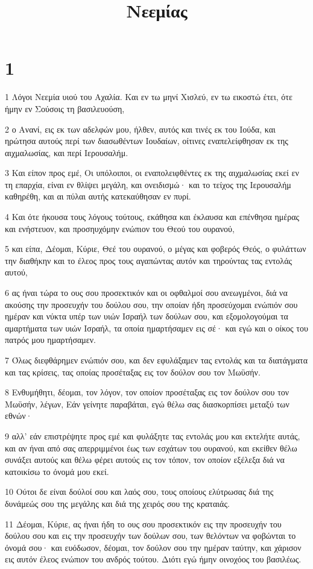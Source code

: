 

\title{Νεεμίας}


\chapter{1}

\par 1 Λόγοι Νεεμία υιού του Αχαλία. Και εν τω μηνί Χισλεύ, εν τω εικοστώ έτει, ότε ήμην εν Σούσοις τη βασιλευούση,
\par 2 ο Ανανί, εις εκ των αδελφών μου, ήλθεν, αυτός και τινές εκ του Ιούδα, και ηρώτησα αυτούς περί των διασωθέντων Ιουδαίων, οίτινες εναπελείφθησαν εκ της αιχμαλωσίας, και περί Ιερουσαλήμ.
\par 3 Και είπον προς εμέ, Οι υπόλοιποι, οι εναπολειφθέντες εκ της αιχμαλωσίας εκεί εν τη επαρχία, είναι εν θλίψει μεγάλη, και ονειδισμώ· και το τείχος της Ιερουσαλήμ καθηρέθη, και αι πύλαι αυτής κατεκαύθησαν εν πυρί.
\par 4 Και ότε ήκουσα τους λόγους τούτους, εκάθησα και έκλαυσα και επένθησα ημέρας και ενήστευον, και προσηυχόμην ενώπιον του Θεού του ουρανού,
\par 5 και είπα, Δέομαι, Κύριε, Θεέ του ουρανού, ο μέγας και φοβερός Θεός, ο φυλάττων την διαθήκην και το έλεος προς τους αγαπώντας αυτόν και τηρούντας τας εντολάς αυτού,
\par 6 ας ήναι τώρα το ους σου προσεκτικόν και οι οφθαλμοί σου ανεωγμένοι, διά να ακούσης την προσευχήν του δούλου σου, την οποίαν ήδη προσεύχομαι ενώπιόν σου ημέραν και νύκτα υπέρ των υιών Ισραήλ των δούλων σου, και εξομολογούμαι τα αμαρτήματα των υιών Ισραήλ, τα οποία ημαρτήσαμεν εις σέ· και εγώ και ο οίκος του πατρός μου ημαρτήσαμεν.
\par 7 Όλως διεφθάρημεν ενώπιόν σου, και δεν εφυλάξαμεν τας εντολάς και τα διατάγματα και τας κρίσεις, τας οποίας προσέταξας εις τον δούλον σου τον Μωϋσήν.
\par 8 Ενθυμήθητι, δέομαι, τον λόγον, τον οποίον προσέταξας εις τον δούλον σου τον Μωϋσήν, λέγων, Εάν γείνητε παραβάται, εγώ θέλω σας διασκορπίσει μεταξύ των εθνών·
\par 9 αλλ' εάν επιστρέψητε προς εμέ και φυλάξητε τας εντολάς μου και εκτελήτε αυτάς, και αν ήναι από σας απερριμμένοι έως των εσχάτων του ουρανού, και εκείθεν θέλω συνάξει αυτούς και θέλω φέρει αυτούς εις τον τόπον, τον οποίον εξέλεξα διά να κατοικίσω το όνομά μου εκεί.
\par 10 Ούτοι δε είναι δούλοί σου και λαός σου, τους οποίους ελύτρωσας διά της δυνάμεώς σου της μεγάλης και διά της χειρός σου της κραταιάς.
\par 11 Δέομαι, Κύριε, ας ήναι ήδη το ους σου προσεκτικόν εις την προσευχήν του δούλου σου και εις την προσευχήν των δούλων σου, των θελόντων να φοβώνται το όνομά σου· και ευόδωσον, δέομαι, τον δούλον σου την ημέραν ταύτην, και χάρισον εις αυτόν έλεος ενώπιον του ανδρός τούτου. Διότι εγώ ήμην οινοχόος του βασιλέως.

